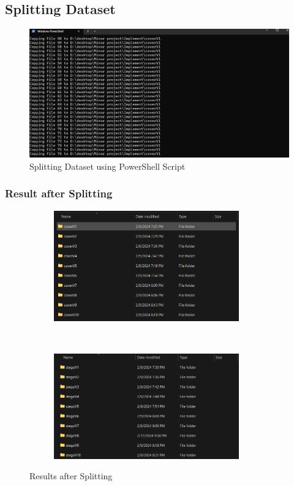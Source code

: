 \subsection{Splitting Dataset}
\begin{figure}[H]
    \centering
    \includegraphics[width=150mm]{./img/splitting.png}
    \caption{Splitting Dataset using PowerShell Script}
\end{figure}
\subsubsection{Result after Splitting}
\begin{figure}[H]
    \centering
    \begin{subfigure}[H]{.5\textwidth}
        \includegraphics[width=80mm]{./img/split1.png}
    \end{subfigure}
    \\
    \begin{subfigure}[H]{.5\textwidth}
        \includegraphics[width=80mm]{./img/split2.png}
    \end{subfigure}
    \caption{Results after Splitting}
\end{figure}
